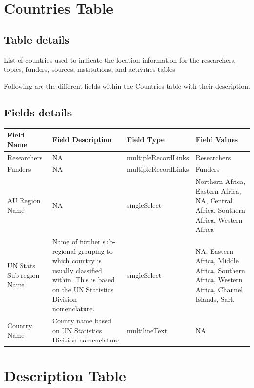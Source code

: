 \documentclass[
]{book}
\begin{document}
\hypertarget{countries-table}{%
\section{Countries Table}\label{countries-table}}

\hypertarget{table-details-1}{%
\subsection{Table details}\label{table-details-1}}

List of countries used to indicate the location information for the researchers, topics, funders, sources, institutions, and activities tables

Following are the different fields within the Countries table with their description.

\hypertarget{fields-details-1}{%
\subsection{Fields details}\label{fields-details-1}}

\begin{table}
\centering
\begin{tabular}{l|l|l|l}
\hline
\textbf{Field Name} & \textbf{Field Description} & \textbf{Field Type} & \textbf{Field Values}\\
\hline
Researchers & NA & multipleRecordLinks & Researchers\\
\hline
Funders & NA & multipleRecordLinks & Funders\\
\hline
AU Region Name & NA & singleSelect & Northern Africa, Eastern Africa, NA, Central Africa, Southern Africa, Western Africa\\
\hline
UN Stats Sub-region Name & Name of further sub-regional grouping to which country is usually classified within. This is based on the UN Statistics Division nomenclature. & singleSelect & NA, Eastern Africa, Middle Africa, Southern Africa, Western Africa, Channel Islands, Sark\\
\hline
Country Name & County name based on UN Statistics Division nomenclature & multilineText & NA\\
\hline
\end{tabular}
\end{table}

\hypertarget{description-table}{%
\section{Description Table}\label{description-table}}
\end{document}
